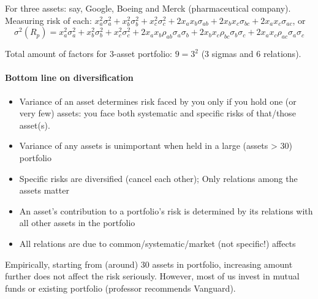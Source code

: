 \documentclass{scrartcl}
\begin{document}
For three assets: say, Google, Boeing and Merck (pharmaceutical company).
Measuring risk of each: $x_a^2 \sigma_a^2 + x_b^2 \sigma_b^2 + x_c^2\sigma_c^2 +
2x_a x_b \sigma_{ab} + 2x_b x_c \sigma_{bc} + 2x_a x_c \sigma_{ac}$, or 
$$\sigma^2(R_p) = x_a^2 \sigma_a^2 + x_b^2 \sigma_b^2 + x_c^2\sigma_c^2 + 2x_a
x_b\rho_{ab} \sigma_a\sigma_b + 2x_b x_c \rho_{bc} \sigma_b\sigma_c + 2x_a x_c
\rho_{ac} \sigma_a\sigma_c$$ 

Total amount of factors for 3-asset portfolio: $9 = 3^2$ (3 sigmas and 6
relations). 

\paragraph{Bottom line on diversification}
\begin{itemize}
\item Variance of an asset determines risk faced by you only if you hold one (or
  very few) assets: you face both systematic and specific risks of that/those
  asset(s).
\item Variance of any assets is unimportant when held in a large (assets > 30)
  portfolio
\item Specific risks are diversified (cancel each other); Only relations among
  the assets matter
\item An asset's contribution to a portfolio's risk is determined by its
  relations with all other assets in the portfolio
\item All relations are due to common/systematic/market (not specific!) affects
\end{itemize}

Empirically, starting from (around) 30 assets in portfolio, increasing amount
further does not affect the risk seriously. However, most of us invest in mutual
funds or existing portfolio (professor recommends Vanguard). 

\end{document}

